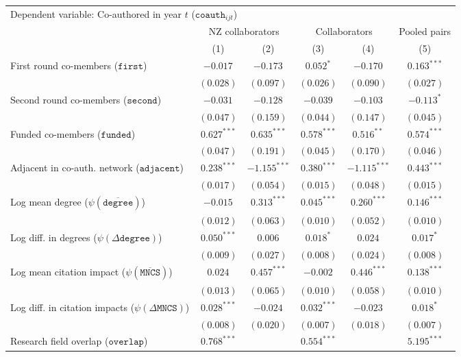 \begin{tabular}{l c c c c c}
\toprule
\multicolumn{5}{l}{Dependent variable: Co-authored in year $t$ ($\mathtt{coauth}_{ijt}$)} \\
& \multicolumn{2}{c}{NZ collaborators} & \multicolumn{2}{c}{Collaborators} & Pooled pairs \\
\cmidrule(lr){2-3} \cmidrule(lr){4-5}
& (1) & (2) & (3) & (4) & (5) \\
\midrule
First round co-members ($\mathtt{first}$) & $-0.017$ & $-0.173$ & $0.052^{*}$ & $-0.170$ & $0.163^{***}$ \\
& $(0.028)$ & $(0.097)$ & $(0.026)$ & $(0.090)$ & $(0.027)$ \\
Second round co-members ($\mathtt{second}$) & $-0.031$ & $-0.128$ & $-0.039$ & $-0.103$ & $-0.113^{*}$ \\
& $(0.047)$ & $(0.159)$ & $(0.044)$ & $(0.147)$ & $(0.045)$ \\
Funded co-members ($\mathtt{funded}$) & $0.627^{***}$ & $0.635^{***}$ & $0.578^{***}$ & $0.516^{**}$ & $0.574^{***}$ \\
& $(0.047)$ & $(0.191)$ & $(0.045)$ & $(0.170)$ & $(0.046)$ \\
Adjacent in co-auth. network ($\mathtt{adjacent}$) & $0.238^{***}$ & $-1.155^{***}$ & $0.380^{***}$ & $-1.115^{***}$ & $0.443^{***}$ \\
& $(0.017)$ & $(0.054)$ & $(0.015)$ & $(0.048)$ & $(0.015)$ \\
Log mean degree ($\psi(\overline{\mathtt{degree}})$) & $-0.015$ & $0.313^{***}$ & $0.045^{***}$ & $0.260^{***}$ & $0.146^{***}$ \\
& $(0.012)$ & $(0.063)$ & $(0.010)$ & $(0.052)$ & $(0.010)$ \\
Log diff. in degrees ($\psi(\Delta \mathtt{degree})$) & $0.050^{***}$ & $0.006$ & $0.018^{*}$ & $0.024$ & $0.017^{*}$ \\
& $(0.009)$ & $(0.027)$ & $(0.008)$ & $(0.024)$ & $(0.008)$ \\
Log mean citation impact ($\psi(\overline{\mathtt{MNCS}})$) & $0.024$ & $0.457^{***}$ & $-0.002$ & $0.446^{***}$ & $0.138^{***}$ \\
& $(0.013)$ & $(0.065)$ & $(0.010)$ & $(0.058)$ & $(0.010)$ \\
Log diff. in citation impacts ($\psi(\Delta\mathtt{MNCS})$) & $0.028^{***}$ & $-0.024$ & $0.032^{***}$ & $-0.023$ & $0.018^{*}$ \\
& $(0.008)$ & $(0.020)$ & $(0.007)$ & $(0.018)$ & $(0.007)$ \\
Research field overlap ($\mathtt{overlap}$) & $0.768^{***}$ & & $0.554^{***}$ & & $5.195^{***}$ \\

\end{tabular}

